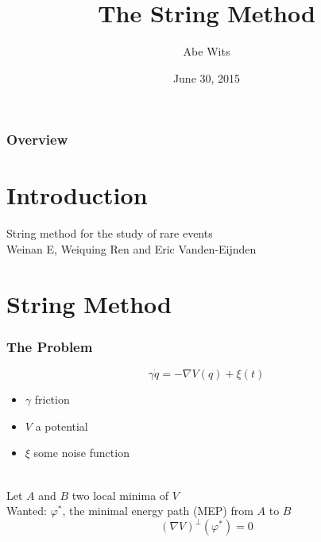\documentclass{beamer}
\title[String Method]{The String Method} %
\author{Abe Wits}
\institute[UU]
{
Utrecht University\\
\medskip
\textit{A.J.G.Wits@uu.nl}
}
\date{June 30, 2015}
\renewcommand{\phi}{\varphi}
\renewcommand{\(}{\left(}
\renewcommand{\)}{\right)}
\begin{document}
\begin{frame}
\titlepage
\end{frame}

\begin{frame}
\frametitle{Overview}
\tableofcontents
\end{frame}

\section{Introduction}%
\begin{frame}
String method for the study of rare events\\
Weinan E, Weiquing Ren and Eric Vanden-Eijnden
\end{frame}


\section{String Method}
\begin{frame}
\frametitle{The Problem}
$$\gamma \dot{q} = -\nabla V(q)+\xi(t)$$
\begin{itemize}
\item $\gamma$ friction
\item $V$ a potential
\item $\xi$ some noise function
\end{itemize}
~\\
Let $A$ and $B$ two local minima of $V$\\
Wanted: $\phi^*$, the minimal energy path (MEP) from $A$ to $B$
$$(\nabla V)^\bot(\phi^*)=0$$
\end{frame}
\end{document}

